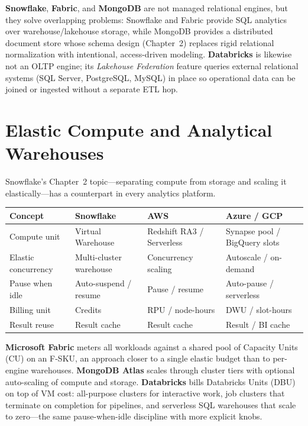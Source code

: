 \noindent \textbf{Snowflake}, \textbf{Fabric}, and \textbf{MongoDB} are not managed relational
engines, but they solve overlapping problems: Snowflake and Fabric provide SQL analytics over
warehouse/lakehouse storage, while MongoDB provides a distributed document store whose schema
design (Chapter~2) replaces rigid relational normalization with intentional, access-driven modeling.
\textbf{Databricks} is likewise not an OLTP engine; its \emph{Lakehouse Federation} feature queries
external relational systems (SQL Server, PostgreSQL, MySQL) in place so operational data can be
joined or ingested without a separate ETL hop.

\section{Elastic Compute and Analytical Warehouses}
%
Snowflake's Chapter~2 topic---separating compute from storage and scaling it elastically---has a
counterpart in every analytics platform.

\begin{center}
\footnotesize
\begin{tabular}{@{}p{2.8cm}p{3.2cm}p{3.2cm}p{3.2cm}@{}}
\toprule
\textbf{Concept} & \textbf{Snowflake} & \textbf{AWS} & \textbf{Azure / GCP} \\
\midrule
Compute unit & Virtual Warehouse & Redshift RA3 / Serverless & Synapse pool / BigQuery slots \\
Elastic concurrency & Multi-cluster warehouse & Concurrency scaling & Autoscale / on-demand \\
Pause when idle & Auto-suspend / resume & Pause / resume & Auto-pause / serverless \\
Billing unit & Credits & RPU / node-hours & DWU / slot-hours \\
Result reuse & Result cache & Result cache & Result / BI cache \\
\bottomrule
\end{tabular}
\end{center}

\noindent \textbf{Microsoft Fabric} meters all workloads against a shared pool of Capacity Units
(CU) on an F-SKU, an approach closer to a single elastic budget than to per-engine warehouses.
\textbf{MongoDB Atlas} scales through cluster tiers with optional auto-scaling of compute and storage.
\textbf{Databricks} bills Databricks Units (DBU) on top of VM cost: all-purpose clusters for
interactive work, job clusters that terminate on completion for pipelines, and serverless SQL
warehouses that scale to zero---the same pause-when-idle discipline with more explicit knobs.

